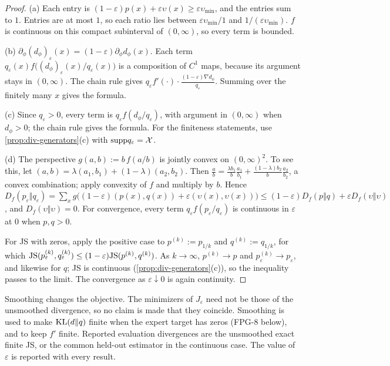 \begin{proof}
(a) Each entry is $(1-\varepsilon)p(x)+\varepsilon\upsilon(x)\ge\varepsilon\upsilon_{\min}$, and the entries sum to $1$.
 Entries are at most $1$, so each ratio lies between $\varepsilon\upsilon_{\min}/1$ and $1/(\varepsilon\upsilon_{\min})$.
 $f$ is continuous on this compact subinterval of $(0,\infty)$, so every term is bounded.

(b) $\partial_\phi(d_\phi)_\varepsilon(x)=(1-\varepsilon)\partial_\phi d_\phi(x)$.
Each term $q_\varepsilon(x)f\big((d_\phi)_\varepsilon(x)/q_\varepsilon(x)\big)$ is a composition of $C^1$ maps, because its argument stays in $(0,\infty)$.
The chain rule gives $q_\varepsilon f'(\cdot)\cdot\frac{(1-\varepsilon)\nabla d_\phi}{q_\varepsilon}$. Summing over the finitely many $x$ gives the formula.

(c) Since $q_\varepsilon>0$, every term is $q_\varepsilon f(d_\phi/q_\varepsilon)$, with argument in $(0,\infty)$ when $d_\phi>0$; the chain rule gives the formula.
For the finiteness statements, use \cref{prop:div-generators}(c) with $\mathrm{supp} q_\varepsilon=\mathcal X$.

(d) The perspective $g(a,b):=b\,f(a/b)$ is jointly convex on $(0,\infty)^2$.
To see this, let $(a,b)=\lambda(a_1,b_1)+(1-\lambda)(a_2,b_2)$.
Then $\frac ab=\frac{\lambda b_1}b\frac{a_1}{b_1}+\frac{(1-\lambda)b_2}{b}\frac{a_2}{b_2}$, a convex combination; apply convexity of $f$ and multiply by $b$.
Hence $D_f(p_\varepsilon\Vert q_\varepsilon)=\sum_xg\big((1-\varepsilon)(p(x),q(x))+\varepsilon(\upsilon(x),\upsilon(x))\big)\le(1-\varepsilon)D_f(p\Vert q)+\varepsilon D_f(\upsilon\Vert\upsilon)$, and $D_f(\upsilon\Vert\upsilon)=0$.
For convergence, every term $q_\varepsilon f(p_\varepsilon/q_\varepsilon)$ is continuous in $\varepsilon$ at $0$ when $p,q>0$.

For JS with zeros, apply the positive case to $p^{(k)}:=p_{1/k}$ and $q^{(k)}:=q_{1/k}$, for which $\mathrm{JS}(p^{(k)}_\varepsilon,q^{(k)}_\varepsilon)\le(1-\varepsilon)\mathrm{JS}(p^{(k)},q^{(k)})$.
As $k\to\infty$, $p^{(k)}\to p$ and $p^{(k)}_\varepsilon\to p_\varepsilon$, and likewise for $q$; JS is continuous (\cref{prop:div-generators}(c)), so the inequality passes to the limit.
The convergence as $\varepsilon\downarrow0$ is again continuity.
\end{proof}

\begin{remark}\label{rem:div-smooth}
Smoothing changes the objective.
The minimizers of $J_\varepsilon$ need not be those of the unsmoothed divergence, so no claim is made that they coincide.
Smoothing is used to make $\mathrm{KL}(d\Vert q)$ finite when the expert target has zeros (FPG-8 below), and to keep $f'$ finite.
Reported evaluation divergences are the unsmoothed exact finite JS, or the common held-out estimator in the continuous case. The value of $\varepsilon$ is reported with every result.
\end{remark}
